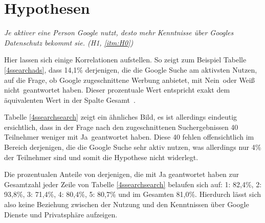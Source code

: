 \section{Hypothesen}
\textit{Je aktiver eine Person Google nutzt, desto mehr Kenntnisse über Googles Datenschutz bekommt sie. (H1, \ref{itm:H0})}

Hier lassen sich einige Korrelationen aufstellen. So zeigt zum Beispiel Tabelle \ref{4ssearchads}, dass 14,1\% derjenigen, die die Google Suche am aktivsten Nutzen, auf die Frage, ob Google zugeschnittene Werbung anbietet, mit \glqq Nein\grqq\ oder \glqq Weiß nicht\grqq\ geantwortet haben. Dieser prozentuale Wert entspricht exakt dem äquivalenten Wert in der Spalte \glqq Gesamt\grqq\ .

Tabelle \ref{4ssearchsearch} zeigt ein ähnliches Bild, es ist allerdings eindeutig ersichtlich, dass in der Frage nach den zugeschnittenen Suchergebnissen 40 Teilnehmer weniger mit \grqq Ja\glqq\ geantwortet haben. Diese 40 fehlen offensichtlich im Bereich derjenigen, die die Google Suche sehr aktiv nutzen, was allerdings nur 4\% der Teilnehmer sind und somit die Hypothese nicht widerlegt.

Die prozentualen Anteile von derjenigen, die mit Ja geantwortet haben zur Gesamtzahl jeder Zeile von Tabelle \ref{4ssearchsearch} belaufen sich auf: 1: 82,4\%, 2: 93,8\%, 3: 71,4\%, 4: 80,4\%, 5: 80,7\% und im Gesamten 81,0\%. Hierdurch lässt sich also keine Beziehung zwischen der Nutzung und den Kenntnissen über Google Dienste und Privatsphäre aufzeigen.

